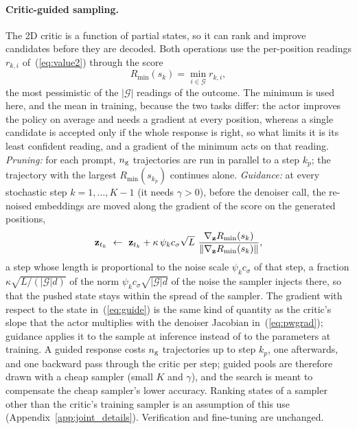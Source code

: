 \paragraph{Critic-guided sampling.}
The 2D critic is a function of partial states, so it can rank and improve candidates before they are decoded. Both operations use the per-position readings $r_{k,i}$ of~(\ref{eq:value2}) through the score
\begin{equation}
R_{\min}(s_k)=\min_{i\in\mathcal G}r_{k,i},
\label{eq:minscore}
\end{equation}
the most pessimistic of the $|\mathcal G|$ readings of the outcome. The minimum is used here, and the mean in training, because the two tasks differ: the actor improves the policy on average and needs a gradient at every position, whereas a single candidate is accepted only if the whole response is right, so what limits it is its least confident reading, and a gradient of the minimum acts on that reading. \emph{Pruning:} for each prompt, $n_{\rm g}$ trajectories are run in parallel to a step $k_p$; the trajectory with the largest $R_{\min}(s_{k_p})$ continues alone. \emph{Guidance:} at every stochastic step $k=1,\dots,K-1$ (it needs $\gamma>0$), before the denoiser call, the re-noised embeddings are moved along the gradient of the score on the generated positions,
\begin{equation}
\rvz_{t_k}\ \leftarrow\ \rvz_{t_k}+\kappa\,\psi_kc_\sigma\sqrt L\ \frac{\nabla_{\rvz}R_{\min}(s_k)}{\|\nabla_{\rvz}R_{\min}(s_k)\|},
\label{eq:guide}
\end{equation}
a step whose length is proportional to the noise scale $\psi_kc_\sigma$ of that step, a fraction $\kappa\sqrt{L/(|\mathcal G|d)}$ of the norm $\psi_kc_\sigma\sqrt{|\mathcal G|d}$ of the noise the sampler injects there, so that the pushed state stays within the spread of the sampler. The gradient with respect to the state in~(\ref{eq:guide}) is the same kind of quantity as the critic's slope that the actor multiplies with the denoiser Jacobian in~(\ref{eq:pwgrad}); guidance applies it to the sample at inference instead of to the parameters at training. A guided response costs $n_{\rm g}$ trajectories up to step $k_p$, one afterwards, and one backward pass through the critic per step; guided pools are therefore drawn with a cheap sampler (small $K$ and $\gamma$), and the search is meant to compensate the cheap sampler's lower accuracy. Ranking states of a sampler other than the critic's training sampler is an assumption of this use (Appendix~\ref{app:joint_details}). Verification and fine-tuning are unchanged.

